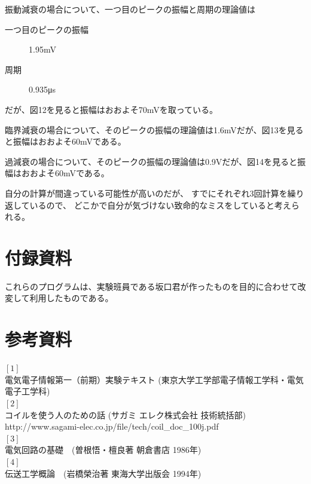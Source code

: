 \documentclass[10pt,a4j,dvipdfmx]{jsarticle}
\begin{document}
振動減衰の場合について、一つ目のピークの振幅と周期の理論値は
\begin{description}
 \item[一つ目のピークの振幅] 1.95\si{\milli\volt}
 \item[周期] {0.935}\si{\micro\second}
\end{description}
だが、図12を見ると振幅はおおよそ70\si{\milli\volt}を取っている。

臨界減衰の場合について、そのピークの振幅の理論値は1.6\si{\milli\volt}だが、図13を見ると振幅はおおよそ60\si{\milli\volt}である。

過減衰の場合について、そのピークの振幅の理論値は0.9\si{\volt}だが、図14を見ると振幅はおおよそ60\si{\milli\volt}である。

自分の計算が間違っている可能性が高いのだが、
すでにそれぞれ3回計算を繰り返しているので、
どこかで自分が気づけない致命的なミスをしていると考えられる。

\section{付録資料}
これらのプログラムは、実験班員である坂口君が作ったものを目的に合わせて改変して利用したものである。



\section{参考資料}
$[1]$ \\
電気電子情報第一（前期）実験テキスト (東京大学工学部電子情報工学科・電気電子工学科)\\
$[2]$ \\
コイルを使う人のための話 (サガミ エレク株式会社 技術統括部) \\
http://www.sagami-elec.co.jp/file/tech/coil\_doc\_100j.pdf \\
$[3]$ \\
電気回路の基礎　(曽根悟・檀良著 朝倉書店 1986年) \\
$[4]$ \\
伝送工学概論　(岩橋榮治著 東海大学出版会 1994年) \\
\end{document}
